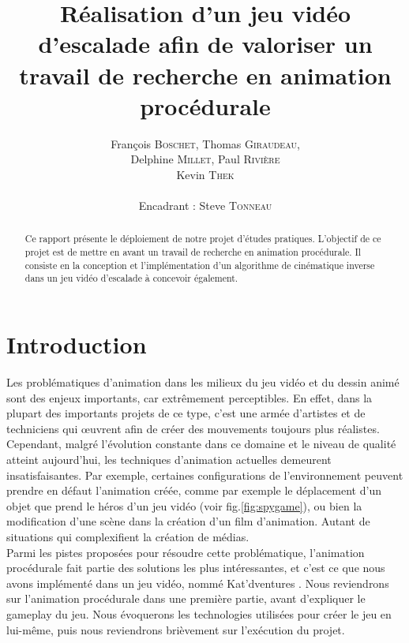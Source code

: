 \documentclass[a4paper,11pt]{article}
\title{ \textbf{Réalisation d'un jeu vidéo d'escalade afin de valoriser un travail de recherche en 
animation procédurale} }
\author{François \textsc{Boschet}, Thomas \textsc{Giraudeau}, \\
        Delphine \textsc{Millet}, Paul \textsc{Rivière} \\
        Kevin \textsc{Thek} \\
        \\
        Encadrant : Steve \textsc{Tonneau}}
\date{}                    %
\begin{document}
          

\maketitle                 %
\thispagestyle{empty}      %



\begin{abstract}
Ce rapport présente le déploiement de notre projet d'études pratiques. L'objectif de ce projet est de mettre en avant un travail de recherche en animation procédurale. Il consiste en la conception et l'implémentation d'un algorithme de cinématique inverse dans un jeu vidéo d'escalade à concevoir également.

\end{abstract} 


\section{Introduction}  

Les problématiques d'animation dans les milieux du jeu vidéo et du dessin animé sont des enjeux importants, car extrêmement perceptibles. En effet, dans la plupart des importants projets de ce type, c'est une armée d'artistes et de techniciens qui {\oe}uvrent afin de créer des mouvements toujours plus réalistes. \\
Cependant, malgré l'évolution constante dans ce domaine et le niveau de qualité atteint aujourd'hui, les techniques d'animation actuelles demeurent insatisfaisantes. Par exemple, certaines configurations de l'environnement peuvent prendre en défaut l'animation créée, comme par exemple le déplacement d'un objet que prend le héros d'un jeu vidéo (voir fig.\ref{fig:spygame}), ou bien la modification d'une scène dans la création d'un film d'animation. Autant de situations qui complexifient la création de médias.\\   
Parmi les pistes proposées pour résoudre cette problématique, l'animation procédurale fait partie des solutions les plus intéressantes, et c'est ce que nous avons implémenté dans un jeu vidéo, nommé \og Kat'dventures \fg{}  . Nous reviendrons sur l'animation procédurale dans une première partie, avant d'expliquer le gameplay du jeu. Nous évoquerons les technologies utilisées pour créer le jeu en lui-même, puis nous reviendrons brièvement sur l'exécution du projet.
\end{document}
